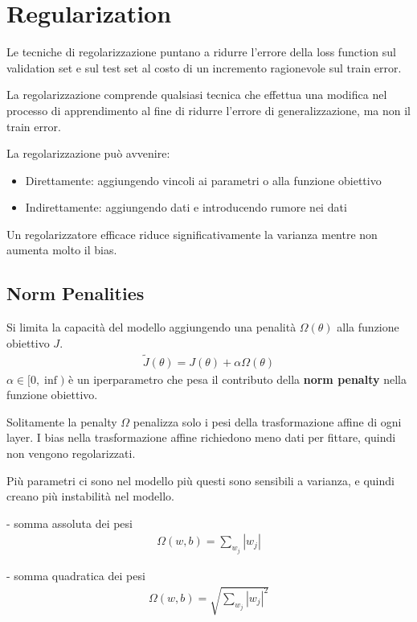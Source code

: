 \chapter{Regularization}
Le tecniche di regolarizzazione puntano a ridurre l'errore della loss function sul validation set e sul test set al costo di un
incremento ragionevole sul train error.

La regolarizzazione comprende qualsiasi tecnica che effettua una modifica nel processo di apprendimento al fine di
ridurre l'errore di generalizzazione, ma non il train error.

La regolarizzazione può avvenire:
\begin{itemize}
  \item Direttamente: aggiungendo vincoli ai parametri o alla funzione obiettivo
  \item Indirettamente: aggiungendo dati e introducendo rumore nei dati
\end{itemize}

Un regolarizzatore efficace riduce significativamente la varianza mentre non aumenta molto il bias.

\section{Norm Penalities}
Si limita la capacità del modello aggiungendo una penalità $\Omega(\theta)$ alla funzione obiettivo $J$.
%
\begin{align*}
  \tilde{J}(\theta) = J(\theta) + \alpha \Omega(\theta)
\end{align*}
%
$\alpha \in [0, \inf)$ è un iperparametro che pesa il contributo della \textbf{norm penalty} nella funzione obiettivo.

Solitamente la penalty $\Omega$ penalizza solo i pesi della trasformazione affine di ogni layer.
I bias nella trasformazione affine richiedono meno dati per fittare, quindi non vengono regolarizzati.

Più parametri ci sono nel modello più questi sono sensibili a varianza, e quindi creano più instabilità nel modello.

- somma assoluta dei pesi
\begin{align*}
  \Omega(w, b) = \sum_{w_j}|w_j|
\end{align*}

- somma quadratica dei pesi
\begin{align*}
  \Omega(w, b) = \sqrt{\sum_{w_j}|w_j|^2}
\end{align*}

